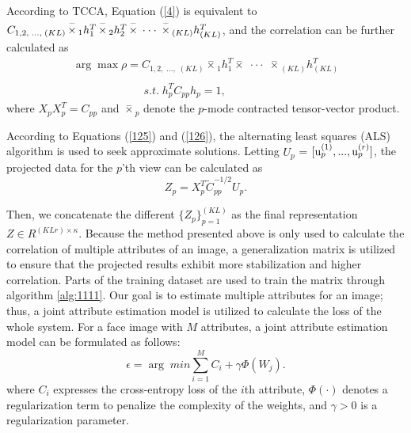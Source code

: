 \documentclass{sig-alternate-05-2015}
\begin{document}
According to TCCA, Equation (\ref{4}) is equivalent to ${C_{1,2,\;...,\;(KL)}}\\ \mathop  \times \limits^ -  {}_1h_1^T\mathop  \times \limits^ -  {}_2h_2^T\mathop  \times \limits^ -  \; \cdot  \cdot  \cdot \;\mathop  \times \limits^ -  {}_{(KL)}h_{(KL)}^T$, and the correlation can be further calculated as
\begin{equation}\label{5}
\begin{array}{l}
\arg \max \rho  = {C_{1,2,\;...,\;(KL)}}\mathop  \times \limits^ -  {}_1h_1^T\mathop  \times \limits^ -  \; \cdot  \cdot  \cdot \;\mathop  \times \limits^ -  {}_{(KL)}h_{(KL)}^T \\
\\
\;\;\;\;\;\;\;\;\;\;\;\;\;\;\;\;\;\;\;\;\;\;\;s.t.\;h_p^T{C_{pp}}{h_p} = 1,
\end{array}
\end{equation}
where ${X_p}X_p^T = {C_{pp}}$ and $\mathop  \times \limits^ -  {}_p$ denote the $p$-mode contracted tensor-vector product.

According to Equations (\ref{125}) and (\ref{126}), the alternating least squares (ALS) algorithm is used to seek approximate solutions. Letting $U_p$ = $[{\rm u}_p^{(1)}, ..., {\rm u}_p^{(r)}]$, the projected data for the $p$'th view can be calculated as
\begin{equation}\label{115}
{Z_p} = X_p^T\widetilde{C}_{pp}^{ - 1/2}{U_p}.
\end{equation}

Then, we concatenate the different $\{Z_p\}_{p=1}^{(KL)}$ as the final representation $Z \in R^{(KLr)\times \kappa}$. Because the method presented above is only used to calculate the correlation of multiple attributes of an image, a  generalization matrix is utilized to ensure that the projected results exhibit more stabilization and higher correlation. Parts of the training dataset are used to train the matrix through algorithm \ref{alg:1111}. Our goal is to estimate multiple attributes for an image; thus, a joint attribute estimation model is utilized to calculate the loss of the whole system. For a face image with $M$ attributes, a joint attribute estimation model can be formulated as follows:
\begin{equation}\label{358}
\epsilon = \arg \;min\sum\limits_{i = 1}^M {{C_i}}  + \gamma \Phi (W_j).
\end{equation}
where $C_i$ expresses the cross-entropy loss of the $i$th attribute, $\Phi(\cdot)$ denotes a regularization term to penalize the complexity of the weights, and $\gamma > 0$ is a regularization parameter.
\end{document}
